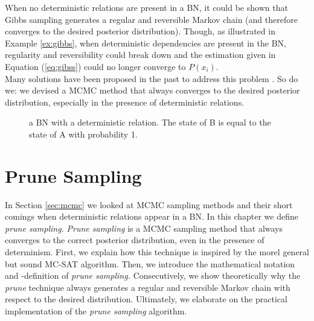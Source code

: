 \documentclass[a4paper, twoside, 11pt]{report}
\theoremstyle{plain}
\theoremstyle{definition}
\theoremstyle{remark}
\newcommand{\ps}{\textit{prune sampling }}
\newcommand{\psp}{\textit{prune sampling. }}
\newcommand{\Ps}{\textit{Prune sampling }}
\begin{document}
When no deterministic relations are present in a BN, it could be shown \cite{poon2006sound} that Gibbs sampling generates a regular and reversible Markov chain (and therefore converges to the desired posterior distribution). Though, as illustrated in Example \ref{ex:gibbs}, when deterministic dependencies are present in the BN, regularity and reversibility could break down and the estimation given in Equation (\ref{eq:gibss}) could no longer converge to $P(x_i)$. \\
Many solutions have been proposed in the past to address this problem \cite{venugopal2013giss, poon2006sound}. So do we: we devised a MCMC method that always converges to the desired posterior distribution, especially in the presence of deterministic relations.
\begin{center}
\begin{figure}[h!]
\centering
{}
\caption{a BN with a deterministic relation. The state of B is equal to the state of A with probability 1.}
\label{gibbs}
\end{figure}
\end{center}

\chapter{Prune Sampling}\label{ch:3}
In Section \ref{sec:mcmc} we looked at MCMC sampling methods and their short comings when deterministic relations appear in a BN. In this chapter we define \psp \Ps is a MCMC sampling method that always converges to the correct posterior distribution, even in the presence of determinism. First, we explain how this technique is inspired by the morel general but sound MC-SAT algorithm. Then, we introduce the mathematical notation and -definition of \psp Consecutively, we show theoretically why the \textit{prune} technique always generates a regular and reversible Markov chain with respect to the desired distribution. Ultimately, we elaborate on the practical implementation of the \ps algorithm.
\end{document}
